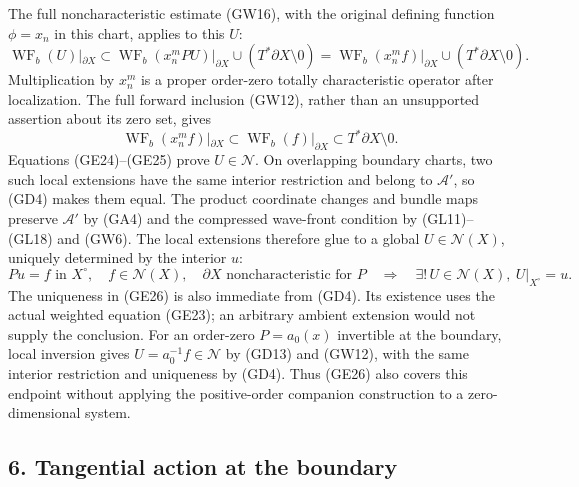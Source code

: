 \documentclass[
  11pt,
]{article}
\makeatletter
\let\ReaderOriginalAnchorStart\hyper@anchorstart
\let\ReaderOriginalAnchorEnd\hyper@anchorend
\let\ReaderPendingAliases\@empty
\def\ReaderArmAliases#1{\gdef\ReaderPendingAliases{#1}}
\def\hyper@anchorstart#1{\ReaderIfNativeAnchorTF{#1}{\ReaderPendingAliases\global\let\ReaderPendingAliases\@empty}{}\ReaderOriginalAnchorStart{#1}}
\makeatother
\begin{document}
The full noncharacteristic estimate (GW16), with the original defining
function \(\phi=x_n\) in this chart, applies to this \(U\): \[
 \operatorname{WF}_b(U)|_{\partial X}
 \subset
 \operatorname{WF}_b(x_n^mPU)|_{\partial X}
       \cup(T^*\partial X\setminus0)
 =\operatorname{WF}_b(x_n^mf)|_{\partial X}
       \cup(T^*\partial X\setminus0).
 \tag{GE24}
\] Multiplication by \(x_n^m\) is a proper order-zero totally
characteristic operator after localization. The full forward inclusion
(GW12), rather than an unsupported assertion about its zero set, gives
\[
 \operatorname{WF}_b(x_n^mf)|_{\partial X}
       \subset\operatorname{WF}_b(f)|_{\partial X}
       \subset T^*\partial X\setminus0.
 \tag{GE25}
\] Equations (GE24)--(GE25) prove \(U\in\mathcal N\). On overlapping
boundary charts, two such local extensions have the same interior
restriction and belong to \(\mathcal A'\), so (GD4) makes them equal.
The product coordinate changes and bundle maps preserve \(\mathcal A'\)
by (GA4) and the compressed wave-front condition by (GL11)--(GL18) and
(GW6). The local extensions therefore glue to a global
\(U\in\mathcal N(X)\), uniquely determined by the interior \(u\): \[
 Pu=f\text{ in }X^\circ,\quad f\in\mathcal N(X),\quad
 \partial X\text{ noncharacteristic for }P
 \quad\Longrightarrow\quad
 \exists!\,U\in\mathcal N(X),\ U|_{X^\circ}=u.
 \tag{GE26}
\] The uniqueness in (GE26) is also immediate from (GD4). Its existence
uses the actual weighted equation (GE23); an arbitrary ambient extension
would not supply the conclusion. For an order-zero \(P=a_0(x)\)
invertible at the boundary, local inversion gives
\(U=a_0^{-1}f\in\mathcal N\) by (GD13) and (GW12), with the same
interior restriction and uniqueness by (GD4). Thus (GE26) also covers
this endpoint without applying the positive-order companion construction
to a zero-dimensional system.

\ReaderArmAliases{\ReaderOriginalAnchorStart{AN03-GBD-006}\ReaderOriginalAnchorEnd\begingroup\expandafter\def\csname @currentHref\endcsname{AN03-GBD-006}\label{AN03-GBD-006}\endgroup\ReaderOriginalAnchorStart{6-tangential-action-at-the-boundary}\ReaderOriginalAnchorEnd\begingroup\expandafter\def\csname @currentHref\endcsname{6-tangential-action-at-the-boundary}\label{6-tangential-action-at-the-boundary}\endgroup}
\subsection{6. Tangential action at the
boundary}\label{tangential-action-at-the-boundary}
\end{document}
